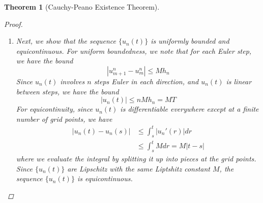 \documentclass[12pt]{amsart}         %
\newtheorem{theorem}{Theorem}[section]
\theoremstyle{remark}
\begin{document}
\begin{theorem}[Cauchy-Peano Existence Theorem]
\begin{proof}
\begin{enumerate}
    \begin{enumerate}
        \item Take $h_n = T/n$ be the grid mesh size, so that the grid for $t$ is given by
        \[
        [-t_n^n, -t_{n-1}^n, \dots, -t_1^n, 0, t_1^n, t_2^n, \dots, t_n^n] = [-n h_n, -(n-1)h_n, \dots, -h_n, 0, h_n, 2 h_n, \dots, n h_n ] 
        \]
        which contains $2n + 1$ grid points, and $n h_n = T$.
        \item We start with initial condition $u_0^n = 0$, then compute $u_n$ on the rest of the grid using the forward Euler method.
        \begin{align*}
            u_0^n &= 0 \\
            u_1^n &=  0 + f(0, 0) h_n \\
            u_2^n &=  u_1^n + f(t_1^n, u_1^n) h_n \\
            & \vdots \\
            u_{m+1}^n &= u_m^n + f(t_m^n, u_m^n) h_n
        \end{align*}
        and similarly for going backwards. 
        \item $u_n(t)$ is the piecewise linear interpolation of these grid values. Since $u_n(t)$ is piecewise linear, $u_n(t)$ is differentiable on the interval $[t_m^n, t_{m+1}^n]$ with
        \[
        u_n'(t) = f(t_m^n, u_m^n)
        \]
        thus on each interval, $|u_n'(t)| \leq M$.
    \end{enumerate}
    
    \item Next, we show that the sequence $\{ u_n(t) \}$ is uniformly bounded and equicontinuous. For uniform boundedness, we note that for each Euler step, we have the bound
    \[
    |u_{m+1}^n - u_m^n| \leq M h_n
    \]
    Since $u_n(t)$ involves $n$ steps Euler in each direction, and $u_n(t)$ is linear between steps, we have the bound
    \[
    |u_n(t)| \leq n M h_n = M T
    \]
    For equicontinuity, since $u_n(t)$ is differentiable everywhere except at a finite number of grid points, we have
    \begin{align*}
        |u_n(t) - u_n(s)| &\leq \int_s^t |u_n'(r)| dr \\
        &\leq \int_s^t M dr = M|t-s|
    \end{align*}
    where we evaluate the integral by splitting it up into pieces at the grid points. Since $\{u_n(t) \}$ are Lipschitz with the same Liptshitz constant $M$, the sequence $\{ u_n(t) \}$ is equicontinuous. 
    

\end{enumerate}
\end{proof}
\end{theorem}
\end{document}
